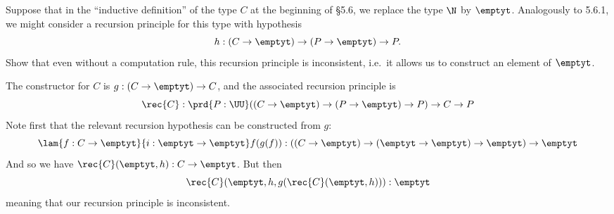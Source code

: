 Suppose that in the ``inductive definition'' of the type $C$ at the beginning
of \S5.6, we replace the type $\N$ by $\emptyt$.  Analogously to
5.6.1, we might consider a recursion principle for this type with hypothesis
\[
  h : (C \to \emptyt) \to (P \to \emptyt) \to P.
\]
Show that even without a computation rule, this recursion principle is
inconsistent, i.e.~it allows us to construct an element of $\emptyt$.


 \soln
The constructor for $C$ is $g : (C \to \emptyt) \to C$, and the associated
recursion principle is
\[
  \rec{C} : \prd{P:\UU} ((C \to \emptyt) \to (P \to \emptyt) \to P) \to C \to P
\]
Note first that the relevant recursion hypothesis can be constructed from $g$:
\[
  \lam{f:C \to \emptyt}{i:\emptyt \to \emptyt}f(g(f))
  : ((C \to \emptyt) \to (\emptyt \to \emptyt) \to \emptyt) \to \emptyt
\]
And so we have $\rec{C}(\emptyt, h) : C \to \emptyt$.  But then
\[
  \rec{C}(\emptyt, h, g(\rec{C}(\emptyt, h))) : \emptyt
\]
meaning that our recursion principle is inconsistent.


